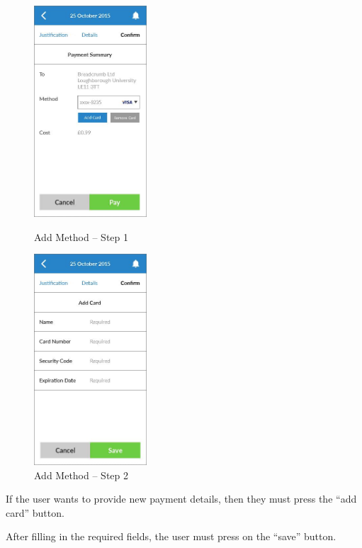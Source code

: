 \begin{figure}
  \subfigures
  \centering
  \begin{minipage}{4.6cm}
    \centering
    \includegraphics[width=4.2cm]{inc/ui_payment_step1.jpg}
    \caption{Add Method -- Step 1}
    \label{fig:ui_payment_step1}
  \end{minipage}
  \begin{minipage}{4.6cm}
    \centering
    \includegraphics[width=4.2cm]{inc/ui_payment_step2.jpg}
    \caption{Add Method -- Step 2}
    \label{fig:ui_payment_step2}
  \end{minipage}
\end{figure}

\begin{minipage}{\textwidth}
  \centering
  \begin{minipage}[t]{4.6cm}
    \vspace{0pt}
    \centering
    \begin{minipage}{4.4cm}
      If the user wants to provide new payment details, then they must press the ``add card'' button.
    \end{minipage}
  \end{minipage}
  \begin{minipage}[t]{4.6cm}
    \vspace{0pt}
    \centering
    \begin{minipage}{4.4cm}
      After filling in the required fields, the user must press on the “save” button.
    \end{minipage}
  \end{minipage}
\end{minipage}

